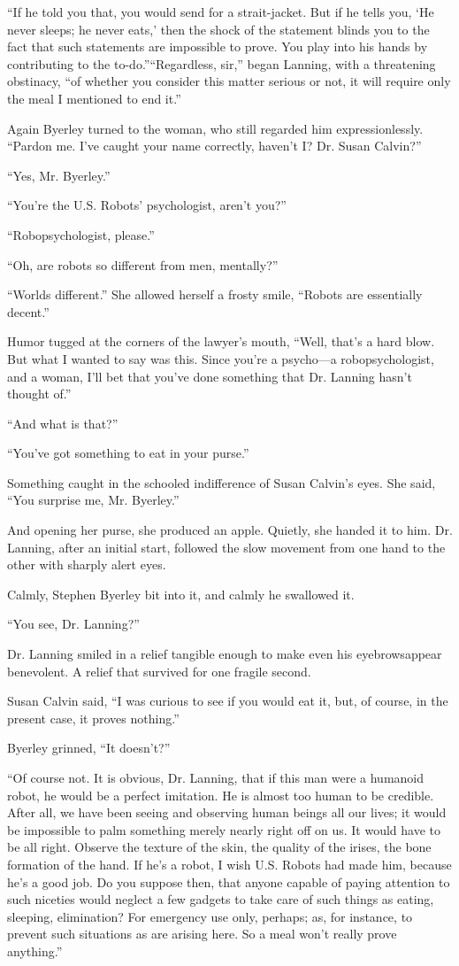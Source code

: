 \documentclass[10pt,a5paper,twoside]{book}
\begin{document}
“If he told you that, you would send for a strait-jacket. But if he tells you, ‘He never sleeps; he never eats,’ then the shock of the statement blinds you to the fact that such statements are impossible to prove. You play into his hands by contributing to the to-do.”“Regardless, sir,” began Lanning, with a threatening obstinacy, “of whether you consider this matter serious or not, it will require only the meal I mentioned to end it.”

Again Byerley turned to the woman, who still regarded him expressionlessly. “Pardon me. I’ve caught your name correctly, haven’t I? Dr. Susan Calvin?”

“Yes, Mr. Byerley.”

“You’re the U.S. Robots’ psychologist, aren’t you?”

“Robopsychologist, please.”

“Oh, are robots so different from men, mentally?”

“Worlds different.” She allowed herself a frosty smile, “Robots are essentially decent.”

Humor tugged at the corners of the lawyer’s mouth, “Well, that’s a hard blow. But what I wanted to say was this. Since you’re a psycho—a robopsychologist, and a woman, I’ll bet that you’ve done something that Dr. Lanning hasn’t thought of.”

“And what is that?”

“You’ve got something to eat in your purse.”

Something caught in the schooled indifference of Susan Calvin’s eyes. She said, “You surprise me, Mr. Byerley.”

And opening her purse, she produced an apple. Quietly, she handed it to him. Dr. Lanning, after an initial start, followed the slow movement from one hand to the other with sharply alert eyes.

Calmly, Stephen Byerley bit into it, and calmly he swallowed it.

“You see, Dr. Lanning?”

Dr. Lanning smiled in a relief tangible enough to make even his eyebrowsappear benevolent. A relief that survived for one fragile second.

Susan Calvin said, “I was curious to see if you would eat it, but, of course, in the present case, it proves nothing.”

Byerley grinned, “It doesn’t?”

“Of course not. It is obvious, Dr. Lanning, that if this man were a humanoid robot, he would be a perfect imitation. He is almost too human to be credible. After all, we have been seeing and observing human beings all our lives; it would be impossible to palm something merely nearly right off on us. It would have to be all right. Observe the texture of the skin, the quality of the irises, the bone formation of the hand. If he’s a robot, I wish U.S. Robots had made him, because he’s a good job. Do you suppose then, that anyone capable of paying attention to such niceties would neglect a few gadgets to take care of such things as eating, sleeping, elimination? For emergency use only, perhaps; as, for instance, to prevent such situations as are arising here. So a meal won’t really prove anything.”
\end{document}
